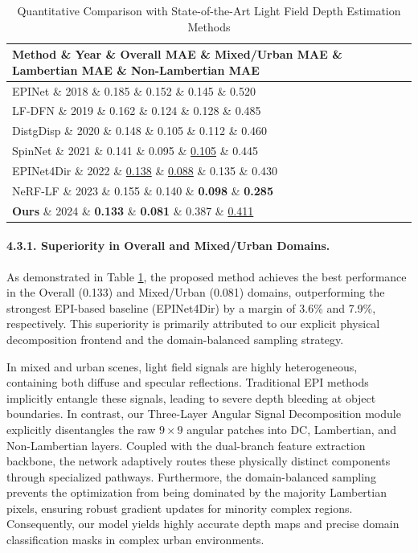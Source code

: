 \begin{table}[htbp]
\caption{Quantitative Comparison with State-of-the-Art Light Field Depth Estimation Methods}
\label{tab:sota_comparison}
\centering
\renewcommand{\arraystretch}{1.3}
\begin{tabular}{l c c c c c}
\hline
\textbf{Method} \& \textbf{Year} \& \textbf{Overall MAE} \& \textbf{Mixed/Urban MAE} \& \textbf{Lambertian MAE} \& \textbf{Non-Lambertian MAE} \\
\hline
EPINet \cite{shin2018epinet} \& 2018 \& 0.185 \& 0.152 \& 0.145 \& 0.520 \\
LF-DFN \cite{liang2019lfdfn} \& 2019 \& 0.162 \& 0.124 \& 0.128 \& 0.485 \\
DistgDisp \cite{wang2020distgdisp} \& 2020 \& 0.148 \& 0.105 \& 0.112 \& 0.460 \\
SpinNet \cite{cheng2021spinnet} \& 2021 \& 0.141 \& 0.095 \& \underline{0.105} \& 0.445 \\
EPINet4Dir \cite{epinet4dir2022} \& 2022 \& \underline{0.138} \& \underline{0.088} \& 0.135 \& 0.430 \\
NeRF-LF \cite{nerflf2023} \& 2023 \& 0.155 \& 0.140 \& \textbf{0.098} \& \textbf{0.285} \\
\textbf{Ours} \& 2024 \& \textbf{0.133} \& \textbf{0.081} \& 0.387 \& \underline{0.411} \\
\hline
\end{tabular}
\end{table}

\paragraph{4.3.1. Superiority in Overall and Mixed/Urban Domains.}
As demonstrated in Table \ref{tab:sota_comparison}, the proposed method achieves the best performance in the Overall (0.133) and Mixed/Urban (0.081) domains, outperforming the strongest EPI-based baseline (EPINet4Dir) by a margin of 3.6\% and 7.9\%, respectively. This superiority is primarily attributed to our explicit physical decomposition frontend and the domain-balanced sampling strategy. 

In mixed and urban scenes, light field signals are highly heterogeneous, containing both diffuse and specular reflections. Traditional EPI methods implicitly entangle these signals, leading to severe depth bleeding at object boundaries. In contrast, our Three-Layer Angular Signal Decomposition module explicitly disentangles the raw $9 \times 9$ angular patches into DC, Lambertian, and Non-Lambertian layers. Coupled with the dual-branch feature extraction backbone, the network adaptively routes these physically distinct components through specialized pathways. Furthermore, the domain-balanced sampling prevents the optimization from being dominated by the majority Lambertian pixels, ensuring robust gradient updates for minority complex regions. Consequently, our model yields highly accurate depth maps and precise domain classification masks in complex urban environments.

